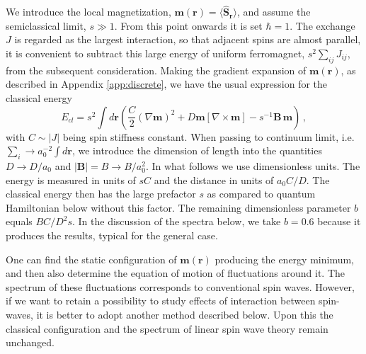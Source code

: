 \documentclass[aps,prb,twocolumn,superscriptaddress,nobalancelastpage]{revtex4-1}
\begin{document}
 
We   introduce the local magnetization, $\mathbf{m}(\mathbf{r}) = \langle \widehat{\mathbf{S}}_{\mathbf{r}} \rangle  $,  and  assume the semiclassical limit, $s\gg 1$. From this point onwards it is set $\hbar =1$. The exchange $J$ is regarded as the largest interaction, so that adjacent spins are almost parallel, it is convenient to subtract this large energy of uniform ferromagnet, $s^{2}\sum_{ij} J_{ij}$, from the subsequent consideration.  Making the gradient expansion of $\mathbf{m}(\mathbf{r})$, 
 as described  in Appendix \ref{app:discrete},  
we have the usual expression for the classical energy 
\begin{equation}
\label{eq:en_class}
E_{cl}= s^{2 }\int d\mathbf{r} \left( \frac{C}{2} \left( \nabla \mathbf{m} \right)^2 + D\mathbf{m}\left[ \nabla \times \mathbf{m} \right] - s^{-1}\mathbf{B}\, \mathbf{m} \right) \,, 
\end{equation}
with $C \sim |J| $ being spin stiffness constant.  When passing to continuum limit, i.e. $\sum_{i} \to a_{0}^{-2}\int d\mathbf{r}$, we introduce the dimension of length into the quantities $D \to D/a_{0}$ and $|\mathbf{B}|=B\to B/a_{0}^{2}$.  
In what follows we use dimensionless units. The energy is measured in units of $sC$   and the distance in units of $a_{0}C/D$.  The classical energy then has the large prefactor $s$ as compared to quantum Hamiltonian below without this factor. The remaining dimensionless parameter $b$ equals $BC/D^2s$. In  the discussion of the spectra below, we take $b=0.6$   because it produces the  results, typical for the general case.  



One can find the static configuration of $\mathbf{m}(\mathbf{r})$ producing the energy minimum, and then also determine the equation of motion of fluctuations around it. The spectrum of these fluctuations corresponds to conventional spin waves.  However, if we want to retain a possibility to study effects of interaction between spin-waves, \cite{Aristov2016b} it is better to adopt another method described below.  Upon this the classical configuration and the spectrum of linear spin wave theory remain unchanged. 
\end{document}
